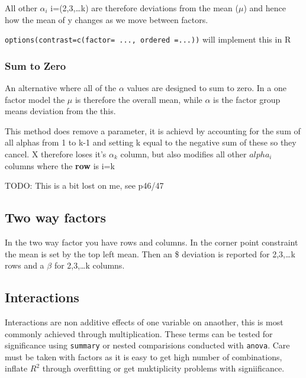 \documentclass[
  letterpaper,
  DIV=11,
  numbers=noendperiod]{scrreprt}
\begin{document}
All other \(\alpha_i\) i=(2,3,\ldots k) are therefore deviations from
the mean (\(\mu\)) and hence how the mean of y changes as we move
between factors.

\texttt{options(contrast=c(factor=\ ...,\ ordered\ =...))} will
implement this in R

\hypertarget{sum-to-zero}{%
\subsubsection{Sum to Zero}\label{sum-to-zero}}

An alternative where all of the \(\alpha\) values are designed to sum to
zero. In a one factor model the \(\mu\) is therefore the overall mean,
while \(\alpha\) is the factor group means deviation from the this.

This method does remove a parameter, it is achievd by accounting for the
sum of all alphas from 1 to k-1 and setting k equal to the negative sum
of these so they cancel. X therefore loses it's \(\alpha_k\) column, but
also modifies all other \(alpha_i\) columns where the \textbf{row} is
i=k

TODO: This is a bit lost on me, see p46/47

\hypertarget{two-way-factors}{%
\subsection{Two way factors}\label{two-way-factors}}

In the two way factor you have rows and columns. In the corner point
constraint the mean is set by the top left mean. Then an \alpha\$
deviation is reported for 2,3,\ldots k rows and a \(\beta\) for
2,3,\ldots k columns.

\hypertarget{interactions}{%
\subsection{Interactions}\label{interactions}}

Interactions are non additive effects of one variable on anaother, this
is most commonly achieved through multiplication. These terms can be
tested for significance using \texttt{summary} or nested comparisions
conducted with \texttt{anova}. Care must be taken with factors as it is
easy to get high number of combinations, inflate \(R^2\) through
overfitting or get muktiplicity problems with signiificance.

\end{document}
